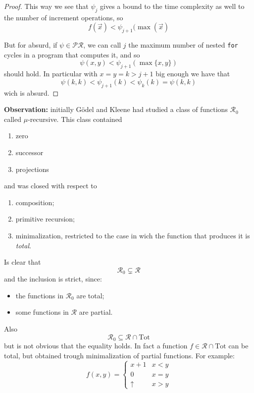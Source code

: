 \begin{theorem}
\begin{proof}
    This way we see that $\psi_j$ gives a bound to the time complexity
    as well to the number of increment operations, so
    \[f(\vec{x}) < \psi_{j+1}(\max(\vec{x})\]

    But for absurd, if $\psi \in \mathcal{PR}$, we can call $j$ the
    maximum number of nested \texttt{for} cycles in a program that
    computes it, and so \[\psi(x,y) < \psi_{j+1}(\max\{x,y\})\] should
    hold. In particular with $x=y=k>j+1$ big enough we have
    that \[\psi(k,k) < \psi_{j+1}(k) < \psi_k(k) = \psi(k,k)\] wich is
    absurd.
  \end{proof}
\end{theorem}

\newpage

\textbf{Observation:} initially Gödel and Kleene had studied a class
of functions $\mathcal{R}_0$ called $\mu$-recursive. This class
contained
\begin{enumerate}[label=\alph*]
\item zero
\item successor
\item projections
\end{enumerate}

and was closed with respect to

\begin{enumerate}
\item composition;
\item primitive recursion;
\item minimalization, restricted to the case in wich the function that
  produces it is \emph{total}.
\end{enumerate}

Is clear that \[\mathcal{R}_0 \subsetneq \mathcal{R}\] and the
inclusion is strict, since:
\begin{itemize}
\item the functions in $\mathcal{R}_0$ are total;
\item some functions in $\mathcal{R}$ are partial.
\end{itemize}

Also \[\mathcal{R}_0 \subseteq \mathcal{R} \cap \text{Tot}\] but is
not obvious that the equality holds. In fact a function
$f \in \mathcal{R} \cap \text{Tot}$ can be total, but obtained trough
minimalization of partial functions. For example:
\[
  f(x,y) = \begin{cases}
    x+1 & x<y \\
    0 & x=y \\
    \uparrow & x>y
  \end{cases}
\]

